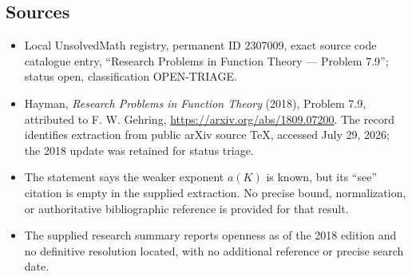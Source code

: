 \documentclass[11pt]{article}
\begin{document}
\subsection{Sources}
\begin{itemize}
\item Local UnsolvedMath registry, permanent ID 2307009, exact source code catalogue entry, ``Research Problems in Function Theory --- Problem 7.9''; status open, classification OPEN-TRIAGE.
\item Hayman, \emph{Research Problems in Function Theory} (2018), Problem 7.9, attributed to F. W. Gehring, \url{https://arxiv.org/abs/1809.07200}. The record identifies extraction from public arXiv source TeX, accessed July 29, 2026; the 2018 update was retained for status triage.
\item The statement says the weaker exponent $a(K)$ is known, but its ``see'' citation is empty in the supplied extraction. No precise bound, normalization, or authoritative bibliographic reference is provided for that result.
\item The supplied research summary reports openness as of the 2018 edition and no definitive resolution located, with no additional reference or precise search date.
\end{itemize}
\end{document}
